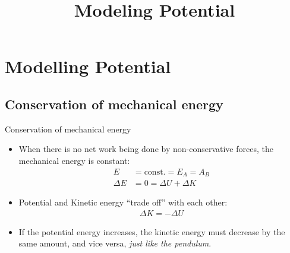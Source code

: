 \documentclass[aspectratio=169,
hyperref={colorlinks,urlcolor=blue}
]{beamer}
\begin{document}

\section{Modelling Potential}
\label{sec:modelingpotential}
\title{Modeling Potential}
\author{\insertsubsection}


\begin{frame}
\titlepage
\thispagestyle{empty}
\end{frame}














\subsection{Conservation of mechanical energy}
\label{subsec:conservationofmechanicalenergy}
\begin{frame}{Conservation of mechanical energy}
\begin{itemize}
\item When there is no net work being done by non-conservative forces, the mechanical energy is constant:
\begin{align*}
E&=\text{const.}=E_A=A_B\\
\Delta E&= 0 =\Delta U + \Delta K
\end{align*}
\item Potential and Kinetic energy ``trade off'' with each other:
\begin{align*}
\Delta K = -\Delta U
\end{align*}
\item If the potential energy increases, the kinetic energy must decrease by the same amount, and vice versa, \textit{just like the pendulum}.
\end{itemize}
\end{frame}


\end{document}
